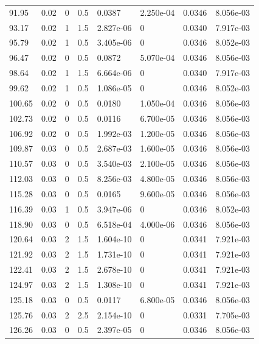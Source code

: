 \documentclass[preview]{standalone}
\begin{document}
{{\begin{tabular}{L{1.2cm}C{1.2cm} C{0.3cm}C{0.5cm} C{1.4cm}C{1.4cm} C{1.4cm}C{1.4cm}}
  91.95  &  0.02  & 0     & 0.5 &  0.0387  & 2.250e-04  & 0.0346 &  8.056e-03   \\ 
  93.17  &  0.02  & 1     & 1.5 &  2.827e-06  & 0  & 0.0340 &  7.917e-03   \\ 
  95.79  &  0.02  & 1     & 0.5 &  3.405e-06  & 0  & 0.0346 &  8.052e-03   \\ 
  96.47  &  0.02  & 0     & 0.5 &  0.0872  & 5.070e-04  & 0.0346 &  8.056e-03   \\ 
  98.64  &  0.02  & 1     & 1.5 &  6.664e-06  & 0  & 0.0340 &  7.917e-03   \\ 
  99.62  &  0.02  & 1     & 0.5 &  1.086e-05  & 0  & 0.0346 &  8.052e-03   \\ 
  100.65  &  0.02  & 0     & 0.5 &  0.0180  & 1.050e-04  & 0.0346 &  8.056e-03   \\ 
  102.73  &  0.02  & 0     & 0.5 &  0.0116  & 6.700e-05  & 0.0346 &  8.056e-03   \\ 
  106.92  &  0.02  & 0     & 0.5 &  1.992e-03  & 1.200e-05  & 0.0346 &  8.056e-03   \\ 
  109.87  &  0.03  & 0     & 0.5 &  2.687e-03  & 1.600e-05  & 0.0346 &  8.056e-03   \\ 
  110.57  &  0.03  & 0     & 0.5 &  3.540e-03  & 2.100e-05  & 0.0346 &  8.056e-03   \\ 
  112.03  &  0.03  & 0     & 0.5 &  8.256e-03  & 4.800e-05  & 0.0346 &  8.056e-03   \\ 
  115.28  &  0.03  & 0     & 0.5 &  0.0165  & 9.600e-05  & 0.0346 &  8.056e-03   \\ 
  116.39  &  0.03  & 1     & 0.5 &  3.947e-06  & 0  & 0.0346 &  8.052e-03   \\ 
  118.90  &  0.03  & 0     & 0.5 &  6.518e-04  & 4.000e-06  & 0.0346 &  8.056e-03   \\ 
  120.64  &  0.03  & 2     & 1.5 &  1.604e-10  & 0  & 0.0341 &  7.921e-03   \\ 
  121.92  &  0.03  & 2     & 1.5 &  1.731e-10  & 0  & 0.0341 &  7.921e-03   \\ 
  122.41  &  0.03  & 2     & 1.5 &  2.678e-10  & 0  & 0.0341 &  7.921e-03   \\ 
  124.97  &  0.03  & 2     & 1.5 &  1.308e-10  & 0  & 0.0341 &  7.921e-03   \\ 
  125.18  &  0.03  & 0     & 0.5 &  0.0117  & 6.800e-05  & 0.0346 &  8.056e-03   \\ 
  125.76  &  0.03  & 2     & 2.5 &  2.154e-10  & 0  & 0.0331 &  7.705e-03   \\ 
  126.26  &  0.03  & 0     & 0.5 &  2.397e-05  & 0  & 0.0346 &  8.056e-03   \\ 

\end{tabular}}}
\end{document}
